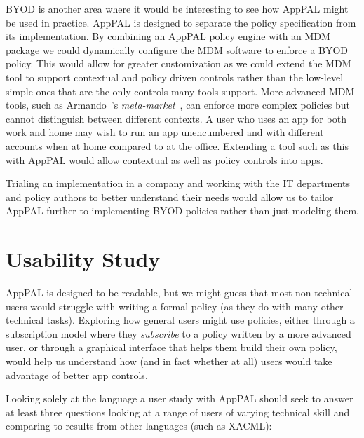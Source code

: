 \documentclass[thesis.tex]{subfiles}
\begin{document}
BYOD is another area where it would be interesting to see how AppPAL might be
used in practice. AppPAL is designed to separate the policy specification from
its implementation. By combining an AppPAL policy engine with an MDM package we
could dynamically configure the MDM software to enforce a BYOD policy. This
would allow for greater customization as we could extend the MDM tool to support
contextual and policy driven controls rather than the low-level simple ones that
are the only controls many tools support. More advanced MDM tools, such as
Armando~\etal's \emph{meta-market}~\cite{armando_enabling_2014}, can enforce
more complex policies but cannot distinguish between different contexts. A user
who uses an app for both work and home may wish to run an app unencumbered and
with different accounts when at home compared to at the office. Extending a tool
such as this with AppPAL would allow contextual as well as policy controls into
apps.

Trialing an implementation in a company and working with the IT departments and
policy authors to better understand their needs would allow us to tailor AppPAL
further to implementing BYOD policies rather than just modeling them.

\section{Usability Study}

AppPAL is designed to be readable, but we might guess that most non-technical
users would struggle with writing a formal policy (as they do with many other
technical tasks). Exploring how general users might use policies, either through
a subscription model where they \emph{subscribe} to a policy written by a more
advanced user, or through a graphical interface that helps them build their own
policy, would help us understand how (and in fact whether at all) users would
take advantage of better app controls.

Looking solely at the language a user study with AppPAL should seek to answer at
least three questions looking at a range of users of varying technical skill and
comparing to results from other languages (such as XACML):
\end{document}
